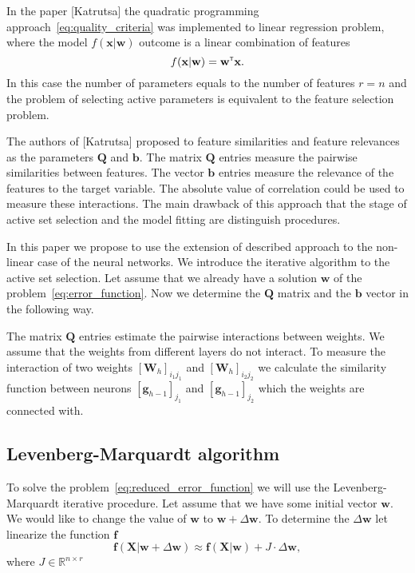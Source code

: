 \documentclass[a4paper,12pt]{article}
\theoremstyle{plain} %
\theoremstyle{definition} %
\theoremstyle{remark} %
\newcommand{\bb}{\mathbf{b}}
\newcommand{\bw}{\mathbf{w}}
\newcommand{\bQ}{\mathbf{Q}}
\newcommand{\bx}{\mathbf{x}}
\newcommand{\bX}{\mathbf{X}}
\newcommand{\bbR}{\mathbb{R}}
\newcommand{\T}{{\text{\tiny\sffamily\upshape\mdseries T}}}
\begin{document}
	In the paper [Katrutsa] the quadratic programming approach~\ref{eq:quality_criteria} was implemented to linear regression problem, where the model $f(\bx | \bw)$ outcome is a linear combination of features
	\begin{equation}
		f(\bx | \bw) = \bw^{\T} \bx.
	\end{equation}
	In this case the number of parameters equals to the number of features $r=n$ and the problem of selecting active parameters is equivalent to the feature selection problem.
	
	The authors of [Katrutsa] proposed to feature similarities and feature relevances as the parameters $\bQ$ and $\bb$.
	The matrix $\bQ$ entries measure the pairwise similarities between features. The vector $\bb$ entries measure the relevance of the features to the target variable. 
	The absolute value of correlation could be used to measure these interactions.
	The main drawback of this approach that the stage of active set selection and the model fitting are distinguish procedures. 
	
	In this paper we propose to use the extension of described approach to the non-linear case of the neural networks. We introduce the iterative algorithm to the active set selection.
	Let assume that we already have a solution $\bw$ of the problem~\ref{eq:error_function}. Now we determine the $\bQ$ matrix and the $\bb$ vector in the following way.
	
	The matrix $\bQ$ entries estimate the pairwise interactions between weights. We assume that the weights from different layers do not interact. To measure the interaction of two weights $[\mathbf{W}_h]_{i_1j_1}$ and $[\mathbf{W}_h]_{i_2j_2}$ we calculate the similarity function between neurons $[\mathbf{g}_{h-1}]_{j_1}$ and $[\mathbf{g}_{h-1}]_{j_2}$ which the weights are connected with.
	
	
	
	\hrulefill
	
	\subsection{Levenberg-Marquardt algorithm}
	To solve the problem~\ref{eq:reduced_error_function} we will use the Levenberg-Marquardt iterative procedure. 
	Let assume that we have some initial vector $\bw$. 
	We would like to change the value of $\bw$ to $\bw + \Delta \bw$. 
	To determine the $\Delta \bw$ let linearize the function $\mathbf{f}$
	\begin{equation}
		\mathbf{f} (\bX | \bw + \Delta \bw) \approx \mathbf{f}(\bX | \bw) + J \cdot \Delta \bw,
	\end{equation}
	where $J \in \bbR^{n \times r}$
	
\end{document}
